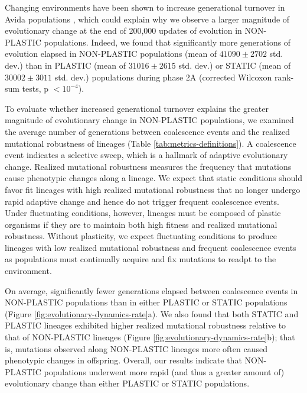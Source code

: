 Changing environments have been shown to increase generational turnover in Avida populations \citep{canino-koning_evolution_2016}, which could explain why we observe a larger magnitude of evolutionary change at the end of 200,000 updates of evolution in NON-PLASTIC populations. 
Indeed, we found that significantly more generations of evolution elapsed in NON-PLASTIC populations (mean of $41090\pm2702$ std. dev.) than in PLASTIC (mean of $31016\pm2615$ std. dev.) or STATIC (mean of $30002\pm3011$ std. dev.) populations during phase 2A (corrected Wilcoxon rank-sum tests, p $<10^{-4}$).

To evaluate whether increased generational turnover explains the greater magnitude of evolutionary change in NON-PLASTIC populations, we examined the average number of generations between coalescence events and the realized mutational robustness of lineages (Table \ref{tab:metrics-definitions}).
A coalescence event indicates a selective sweep, which is a hallmark of adaptive evolutionary change.
Realized mutational robustness measures the frequency that mutations cause phenotypic changes along a lineage.
We expect that static conditions should favor fit lineages with high realized mutational robustness that no longer undergo rapid adaptive change and hence do not trigger frequent coalescence events.
Under fluctuating conditions, however, lineages must be composed of plastic organisms if they are to maintain both high fitness and realized mutational robustness.
Without plasticity, we expect fluctuating conditions to produce lineages with low realized mutational robustness and frequent coalescence events as populations must continually acquire and fix mutations to readpt to the environment.  



On average, significantly fewer generations elapsed between coalescence events in NON-PLASTIC populations than in either PLASTIC or STATIC populations (Figure \ref{fig:evolutionary-dynamics-rate}a).
We also found that both STATIC and PLASTIC lineages exhibited higher realized mutational robustness relative to that of NON-PLASTIC lineages (Figure \ref{fig:evolutionary-dynamics-rate}b); that is, mutations observed along NON-PLASTIC lineages more often caused phenotypic changes in offspring. 
Overall, our results indicate that NON-PLASTIC populations underwent more rapid (and thus a greater amount of) evolutionary change than either PLASTIC or STATIC populations. 

